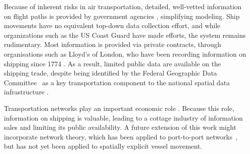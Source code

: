 Because of inherent risks in air transportation, detailed, well-vetted information on flight paths is provided by government agencies \citep{guimera2005worldwide}, simplifying modeling. Ship movements have no equivalent top-down data collection effort, and while organizations such as the US Coast Guard have made efforts, the system remains rudimentary. Most information is provided via private contracts, through organisations such as Lloyd's of London, who have been recording information on shipping since 1774 \citep{Lloyd'sRegister-FairplayLtd.2010}. As a result, limited public data are available on the shipping trade, despite being identified by the Federal Geographic Data Committee~\citep{FGDC} as a key transportation component to the national spatial data infrastructure \citep{CurrierInPress}.

Transportation networks play an important economic role \citep{canning1993effects}. Because this role, information on shipping is valuable, leading to a cottage industry of information sales and limiting its public availability.  A future extension of this work might incorporate network theory, which has been applied to port-to-port networks~\citep{Kaluza2010,ducruet2012worldwide}, but has not yet been applied to spatially explicit vessel movement.




